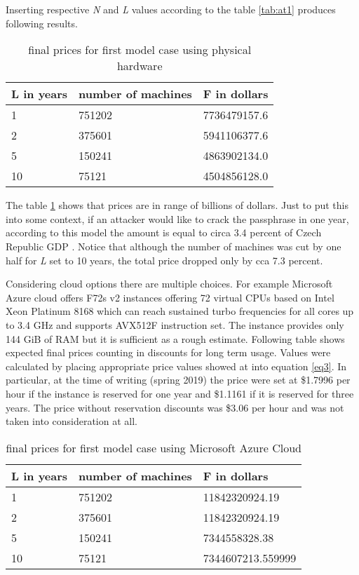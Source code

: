 \documentclass[nolof]{fithesis3}
\begin{document}
Inserting respective \emph{N} and \emph{L} values according to the table \ref{tab:at1} produces following results.

\noindent
\begin{table}
\caption{final prices for first model case using physical hardware}
\label{tab:at2}
\begin{tabularx}{\textwidth}{| X | X | X |}
\hline
L  in years & number of machines & F in dollars\\
\hline
1 & 751202 & 7736479157.6\\
\hline
2 & 375601  & 5941106377.6\\
\hline
5 & 150241 & 4863902134.0\\
\hline
10 & 75121 & 4504856128.0\\
\hline
\end{tabularx}
\end{table}

The table \ref{tab:at2} shows that prices are in range of billions of dollars. Just to put this into some context, if an attacker would like to crack the passphrase in one year, according to this model the amount is equal to circa 3.4 percent of Czech Republic GDP \parencite{czechgdp}. Notice that although the number of machines was cut by one half for \emph{L} set to 10 years, the total price dropped only by cca 7.3 percent.

Considering cloud options there are multiple choices. For example Microsoft Azure cloud offers F72s v2 instances offering 72 virtual CPUs based on Intel Xeon Platinum 8168 which can reach sustained turbo frequencies for all cores up to 3.4 GHz and supports AVX512F instruction set. The instance provides only 144 GiB of RAM but it is sufficient as a rough estimate. Following table shows expected final prices counting in discounts for long term usage. Values were calculated by placing appropriate price values showed at \parencite{azure} into equation \ref{eq3}. In particular, at the time of writing (spring 2019) the price were set at \$1.7996 per hour if the instance is reserved for one year and \$1.1161 if it is reserved for three years. The price without reservation discounts was \$3.06 per hour and was not taken into consideration at all.

\noindent
\begin{table}
\caption{final prices for first model case using Microsoft Azure Cloud}
\label{tab:at3}
\begin{tabularx}{\textwidth}{| X | X | X |}
\hline
L  in years & number of machines & F in dollars\\
\hline
1 & 751202 & 11842320924.19\\
\hline
2 & 375601 & 11842320924.19\\
\hline
5 & 150241 & 7344558328.38\\
\hline
10 & 75121 & 7344607213.559999\\
\hline
\end{tabularx}
\end{table}
\end{document}
